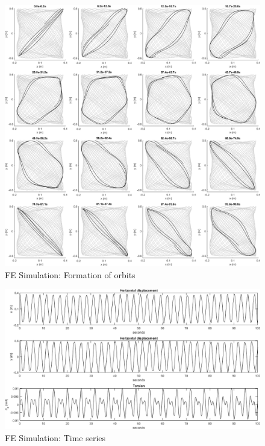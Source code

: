 \documentclass{article}
\begin{document}
\begin{figure}
    \centering
    \includegraphics[width=1\textwidth]{figures/OrbitFormation.png}
    \caption{FE Simulation: Formation of orbits}
    \label{fig:fea:orbit_formation}
\end{figure}

\begin{figure}
    \centering
    \includegraphics[width=1\textwidth]{figures/OrbitDisplacemen.png}
    \caption{FE Simulation: Time series}
    \label{fig:fea:simres:timeseries}
\end{figure}
\end{document}
